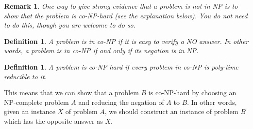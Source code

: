 \documentclass[12pt]{article}
\newtheorem{definition}[theorem]{Definition}
\newtheorem{remark}[theorem]{Remark}
\begin{document}
\begin{remark}
One way to give strong evidence that a problem is not in NP is to show that the problem is co-NP-hard (see the explanation below). You do not need to do this, though you are welcome to do so.
\end{remark}
\begin{definition}
A problem is in co-NP if it is easy to verify a NO answer. In other words, a problem is in co-NP if and only if its negation is in NP.
\end{definition}
\begin{definition}
A problem is co-NP hard if every problem in co-NP is poly-time reducible to it.
\end{definition}
This means that we can show that a problem $B$ is co-NP-hard by choosing an NP-complete problem $A$ and reducing the negation of $A$ to $B$. In other words, given an instance $X$ of problem $A$, we should construct an instance of problem $B$ which  has the opposite answer as $X$.
\end{document}

